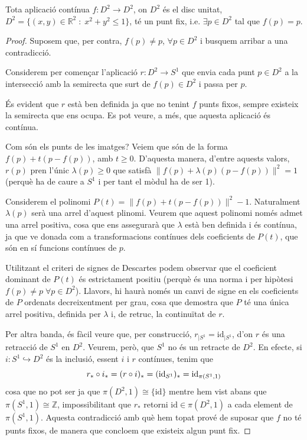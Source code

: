 \documentclass[../main.tex]{subfiles}
\begin{document}
\begin{ter}
\label{ter:puntfixbrouwer} Tota aplicació contínua $f:D^2\rightarrow D^2$, on $D^2$ és el disc unitat, $D^2 = \{(x,y)\in\mathbb{R}^2\;:\;x^2+y^2\leq 1\}$, té un punt fix, i.e. $\exists p\in D^2$ tal que $f(p) = p$.
\end{ter}
\begin{proof}
Suposem que, per contra, $f(p) \not=p$, $\forall p\in D^2$ i busquem arribar a una contradicció.

Considerem per començar l'aplicació $r:D^2\rightarrow S^1$ que envia cada punt $p\in D^2$ a la intersecció amb la semirecta que surt de $f(p)\in D^2$ i passa per $p$.

És evident que $r$ està ben definida ja que no tenint $f$ punts fixos, sempre existeix la semirecta que ens ocupa. Es pot veure, a més, que aquesta aplicació és contínua.

Com són els punts de les imatges? Veiem que són de la forma $f(p) + t(p-f(p))$, amb $t\geq 0$. D'aquesta manera, d'entre aquests valors, $r(p)$ pren l'únic $\lambda(p)\geq 0$ que satisfà $\|f(p)+\lambda(p)(p-f(p))\|^2 = 1$ (perquè ha de caure a $S^1$ i per tant el mòdul ha de ser 1).

Considerem el polinomi $P(t) = \|f(p)+t(p-f(p))\|^2-1$. Naturalment $\lambda(p)$ serà una arrel d'aquest plinomi. Veurem que aquest polinomi només admet una arrel positiva, cosa que ens assegurarà que $\lambda$ està ben definida i és contínua, ja que ve donada com a transformacions contínues dels coeficients de $P(t)$, que són en sí funcions contínues de $p$. 

Utilitzant el criteri de signes de Descartes podem observar que el coeficient dominant de $P(t)$ és estrictament positiu (perquè és una norma i per hipòtesi $f(p) \not=p\;\forall p\in D^2$). Llavors, hi haurà només un canvi de signe en els coeficients de $P$ ordenats decreixentment per grau, cosa que demostra que $P$ té una única arrel positiva, definida per $\lambda$ i, de retruc, la continuïtat de $r$.

Per altra banda, és fàcil veure que, per construcció, $r_{|S^1} = \mathrm{id}_{|S^1}$, d'on $r$ és una retracció de $S^1$ en $D^2$. Veurem, però, que $S^1$ no és un retracte de $D^2$. En efecte, si $i:S^1\hookrightarrow D^2$ és la inclusió, essent $i$ i $r$ contínues, tenim que
\begin{equation}
    \notag
    r_*\circ i_* = (r\circ i)_* = (\mathrm{id}_{S^1})_* = \mathrm{id}_{\pi(S^1,1)}
\end{equation}
cosa que no pot ser ja que $\pi(D^2,1)\cong \{\mathrm{id}\}$ mentre hem vist abans que $\pi(S^1,1)\cong\mathbb{Z}$, impossibilitant que $r_*$ retorni $\mathrm{id}\in \pi(D^2,1)$ a cada element de $\pi(S^1,1)$. Aquesta contradicció amb què hem topat prové de suposar que $f$ no té punts fixos, de manera que concloem que existeix algun punt fix.
\end{proof}
\end{document}
